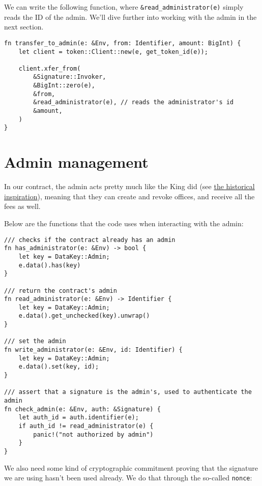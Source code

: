 \documentclass[10pt]{article}
\begin{document}
We can write the following function, where \texttt{\&read\_administrator(e)} simply reads the ID of the admin. We'll dive further into working with the admin in the next section.

\begin{verbatim}
fn transfer_to_admin(e: &Env, from: Identifier, amount: BigInt) {
    let client = token::Client::new(e, get_token_id(e));

    client.xfer_from(
        &Signature::Invoker,
        &BigInt::zero(e),
        &from,
        &read_administrator(e), // reads the administrator's id
        &amount,
    )
}
\end{verbatim}

\section*{Admin management}
In our contract, the admin acts pretty much like the King did (see \href{#inspiration}{the historical inspiration}), meaning that they can create and revoke offices, and receive all the fees as well.

Below are the functions that the code uses when interacting with the admin:

\begin{verbatim}
/// checks if the contract already has an admin
fn has_administrator(e: &Env) -> bool {
    let key = DataKey::Admin;
    e.data().has(key)
}

/// return the contract's admin
fn read_administrator(e: &Env) -> Identifier {
    let key = DataKey::Admin;
    e.data().get_unchecked(key).unwrap()
}

/// set the admin
fn write_administrator(e: &Env, id: Identifier) {
    let key = DataKey::Admin;
    e.data().set(key, id);
}

/// assert that a signature is the admin's, used to authenticate the admin
fn check_admin(e: &Env, auth: &Signature) {
    let auth_id = auth.identifier(e);
    if auth_id != read_administrator(e) {
        panic!("not authorized by admin")
    }
}

\end{verbatim}

We also need some kind of cryptographic commitment proving that the signature we are using hasn't been used already. We do that through the so-called \texttt{nonce}:
\end{document}
